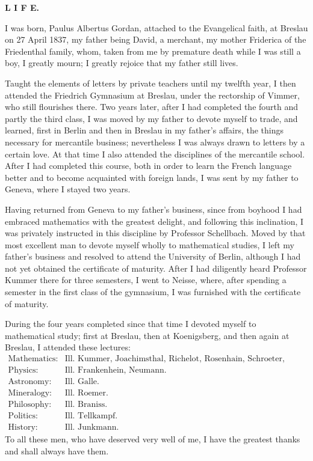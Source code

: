 \begingroup\small
\begin{center}
{\large\bfseries L I F E.}
\end{center}

I was born, Paulus Albertus Gordan, attached to the Evangelical faith, at Breslau on 27 April 1837, my father being David, a merchant, my mother Friderica of the Friedenthal family, whom, taken from me by premature death while I was still a boy, I greatly mourn; I greatly rejoice that my father still lives.

Taught the elements of letters by private teachers until my twelfth year, I then attended the Friedrich Gymnasium at Breslau, under the rectorship of Vimmer, who still flourishes there. Two years later, after I had completed the fourth and partly the third class, I was moved by my father to devote myself to trade, and learned, first in Berlin and then in Breslau in my father's affairs, the things necessary for mercantile business; nevertheless I was always drawn to letters by a certain love. At that time I also attended the disciplines of the mercantile school. After I had completed this course, both in order to learn the French language better and to become acquainted with foreign lands, I was sent by my father to Geneva, where I stayed two years.

Having returned from Geneva to my father's business, since from boyhood I had embraced mathematics with the greatest delight, and following this inclination, I was privately instructed in this discipline by Professor Schellbach. Moved by that most excellent man to devote myself wholly to mathematical studies, I left my father's business and resolved to attend the University of Berlin, although I had not yet obtained the certificate of maturity. After I had diligently heard Professor Kummer there for three semesters, I went to Neisse, where, after spending a semester in the first class of the gymnasium, I was furnished with the certificate of maturity.

During the four years completed since that time I devoted myself to mathematical study; first at Breslau, then at Koenigsberg, and then again at Breslau, I attended these lectures:
\[
\begin{array}{ll}
\text{Mathematics:}& \text{Ill. Kummer, Joachimsthal, Richelot, Rosenhain, Schroeter, Galle.}\\
\text{Physics:}& \text{Ill. Frankenhein, Neumann.}\\
\text{Astronomy:}& \text{Ill. Galle.}\\
\text{Mineralogy:}& \text{Ill. Roemer.}\\
\text{Philosophy:}& \text{Ill. Braniss.}\\
\text{Politics:}& \text{Ill. Tellkampf.}\\
\text{History:}& \text{Ill. Junkmann.}
\end{array}
\]
To all these men, who have deserved very well of me, I have the greatest thanks and shall always have them.

